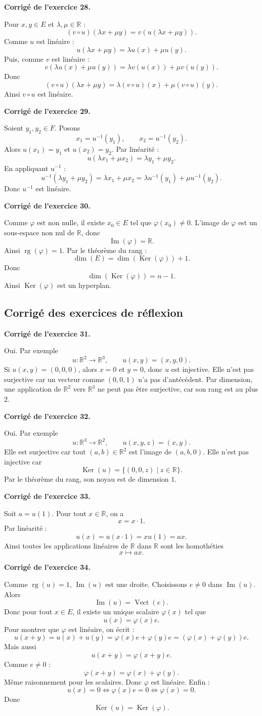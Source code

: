 \documentclass[11pt,a4paper]{article}
\newcommand{\corr}[1]{
    \vspace{0.4cm}
    \noindent\textbf{\textcolor{blue!60!black}{Corrigé de l'exercice #1.}}
    \par\vspace{0.1cm}
}
\newcommand{\Ker}{\operatorname{Ker}}
\newcommand{\Img}{\operatorname{Im}}
\newcommand{\rg}{\operatorname{rg}}
\newcommand{\Vect}{\operatorname{Vect}}
\begin{document}
\corr{28}
Pour $x,y\in E$ et $\lambda,\mu\in\mathbb{R}$ :
\[
(v\circ u)(\lambda x+\mu y)
=v(u(\lambda x+\mu y)).
\]
Comme $u$ est linéaire :
\[
u(\lambda x+\mu y)=\lambda u(x)+\mu u(y).
\]
Puis, comme $v$ est linéaire :
\[
v(\lambda u(x)+\mu u(y))=\lambda v(u(x))+\mu v(u(y)).
\]
Donc
\[
(v\circ u)(\lambda x+\mu y)=\lambda(v\circ u)(x)+\mu(v\circ u)(y).
\]
Ainsi $v\circ u$ est linéaire.

\corr{29}
Soient $y_1,y_2\in F$. Posons
\[
x_1=u^{-1}(y_1),\qquad x_2=u^{-1}(y_2).
\]
Alors $u(x_1)=y_1$ et $u(x_2)=y_2$. Par linéarité :
\[
u(\lambda x_1+\mu x_2)=\lambda y_1+\mu y_2.
\]
En appliquant $u^{-1}$ :
\[
u^{-1}(\lambda y_1+\mu y_2)=\lambda x_1+\mu x_2
=\lambda u^{-1}(y_1)+\mu u^{-1}(y_2).
\]
Donc $u^{-1}$ est linéaire.

\corr{30}
Comme $\varphi$ est non nulle, il existe $x_0\in E$ tel que $\varphi(x_0)\neq 0$. L'image de $\varphi$ est un sous-espace non nul de $\mathbb{R}$, donc
\[
\Img(\varphi)=\mathbb{R}.
\]
Ainsi $\rg(\varphi)=1$. Par le théorème du rang :
\[
\dim(E)=\dim(\Ker(\varphi))+1.
\]
Donc
\[
\dim(\Ker(\varphi))=n-1.
\]
Ainsi $\Ker(\varphi)$ est un hyperplan.

\subsection{Corrigé des exercices de réflexion}

\corr{31}
Oui. Par exemple
\[
u:\mathbb{R}^2\to\mathbb{R}^3,\qquad u(x,y)=(x,y,0).
\]
Si $u(x,y)=(0,0,0)$, alors $x=0$ et $y=0$, donc $u$ est injective. Elle n'est pas surjective car un vecteur comme $(0,0,1)$ n'a pas d'antécédent. Par dimension, une application de $\mathbb{R}^2$ vers $\mathbb{R}^3$ ne peut pas être surjective, car son rang est au plus $2$.

\corr{32}
Oui. Par exemple
\[
u:\mathbb{R}^3\to\mathbb{R}^2,\qquad u(x,y,z)=(x,y).
\]
Elle est surjective car tout $(a,b)\in\mathbb{R}^2$ est l'image de $(a,b,0)$. Elle n'est pas injective car
\[
\Ker(u)=\{(0,0,z)\mid z\in\mathbb{R}\}.
\]
Par le théorème du rang, son noyau est de dimension $1$.

\corr{33}
Soit $a=u(1)$. Pour tout $x\in\mathbb{R}$, on a
\[
x=x\cdot 1.
\]
Par linéarité :
\[
u(x)=u(x\cdot 1)=x u(1)=ax.
\]
Ainsi toutes les applications linéaires de $\mathbb{R}$ dans $\mathbb{R}$ sont les homothéties
\[
x\mapsto ax.
\]

\corr{34}
Comme $\rg(u)=1$, $\Img(u)$ est une droite. Choisissons $e\neq 0$ dans $\Img(u)$. Alors
\[
\Img(u)=\Vect(e).
\]
Donc pour tout $x\in E$, il existe un unique scalaire $\varphi(x)$ tel que
\[
u(x)=\varphi(x)e.
\]
Pour montrer que $\varphi$ est linéaire, on écrit :
\[
u(x+y)=u(x)+u(y)=\varphi(x)e+\varphi(y)e=(\varphi(x)+\varphi(y))e.
\]
Mais aussi
\[
u(x+y)=\varphi(x+y)e.
\]
Comme $e\neq 0$ :
\[
\varphi(x+y)=\varphi(x)+\varphi(y).
\]
Même raisonnement pour les scalaires. Donc $\varphi$ est linéaire. Enfin :
\[
u(x)=0\Longleftrightarrow \varphi(x)e=0\Longleftrightarrow \varphi(x)=0.
\]
Donc
\[
\Ker(u)=\Ker(\varphi).
\]
\end{document}
